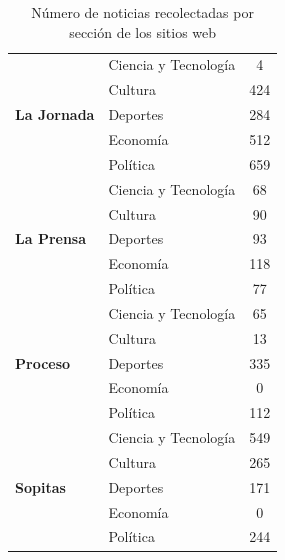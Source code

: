 \begin{table}[H]
\begin{tabular}{|l|l|c|}
\multirow{5}{*}{\textbf{La Jornada}}& Ciencia y Tecnología & 4                  \\ \cline{2-3} 
                                    & Cultura              & 424                \\ \cline{2-3} 
                                    & Deportes             & 284                \\ \cline{2-3} 
                                    & Economía             & 512                \\ \cline{2-3} 
                                    & Política             & 659                \\ \hline
\multirow{5}{*}{\textbf{La Prensa}} & Ciencia y Tecnología & 68                 \\ \cline{2-3} 
                                    & Cultura              & 90                 \\ \cline{2-3} 
                                    & Deportes             & 93                 \\ \cline{2-3} 
                                    & Economía             & 118                \\ \cline{2-3} 
                                    & Política             & 77                 \\ \hline
\multirow{5}{*}{\textbf{Proceso}}   & Ciencia y Tecnología & 65                 \\ \cline{2-3} 
                                    & Cultura              & 13                 \\ \cline{2-3} 
                                    & Deportes             & 335                \\ \cline{2-3} 
                                    & Economía             & 0                  \\ \cline{2-3} 
                                    & Política             & 112                \\ \hline
\multirow{5}{*}{\textbf{Sopitas}}   & Ciencia y Tecnología & 549                \\ \cline{2-3} 
                                    & Cultura              & 265                \\ \cline{2-3} 
                                    & Deportes             & 171                \\ \cline{2-3} 
                                    & Economía             & 0                  \\ \cline{2-3} 
                                    & Política             & 244                \\ \hline
\end{tabular}
\caption[Noticias recolectadas por sitio web]{Número de noticias recolectadas por sección de los sitios web}
\label{tabla:numNotic}
\end{table}




